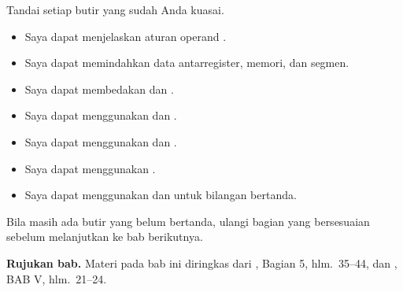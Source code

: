 \begin{checklistbox}
\vspace{1.1em}
Tandai setiap butir yang sudah Anda kuasai.

\begin{itemize}
    \item[\checkbox] Saya dapat menjelaskan aturan operand
          .
    \item[\checkbox] Saya dapat memindahkan data antarregister,
          memori, dan segmen.
    \item[\checkbox] Saya dapat membedakan  dan .
    \item[\checkbox] Saya dapat menggunakan  dan .
    \item[\checkbox] Saya dapat menggunakan  dan
          .
    \item[\checkbox] Saya dapat menggunakan .
    \item[\checkbox] Saya dapat menggunakan  dan
           untuk bilangan bertanda.
\end{itemize}

\vspace{0.4em}
Bila masih ada butir yang belum bertanda, ulangi bagian yang
bersesuaian sebelum melanjutkan ke bab berikutnya.
\end{checklistbox}

\begin{infobox}
\vspace{1.1em}
\textbf{Rujukan bab.} Materi pada bab ini diringkas dari
\cite{gunawan2019}, Bagian 5, hlm.~35--44, dan \cite{sto2001},
BAB V, hlm.~21--24.
\end{infobox}
